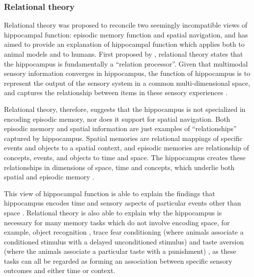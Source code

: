 \subsubsection{Relational theory}

Relational theory was proposed to reconcile two seemingly incompatible views of hippocampal function: episodic memory function and spatial navigation, and has aimed to provide an explanation of hippocampal function which applies both to animal models and to humans. First proposed by \citet{eichenbaum93}, relational theory states that the hippocampus is fundamentally a ``relation processor''. Given that multimodal sensory information converges in hippocampus, the function of hippocampus is to represent the output of the sensory system in a common multi-dimensional space, and captures the relationship between items in these sensory experiences \citep{eichenbaum93}.

Relational theory, therefore, suggests that the hippocampus is not specialized in encoding episodic memory, nor does it support for spatial navigation. Both episodic memory and spatial information are just examples of ``relationships'' captured by hippocampus. Spatial memories are relational mappings of specific events and objects to a spatial context, and episodic memories are relationship of concepts, events, and objects to time and space. The hippocampus creates these relationships in dimensions of space, time and concepts, which underlie both spatial and episodic memory \citep{eichenbaum14}.

This view of hippocampal function is able to explain the findings that hippocampus encodes time and sensory aspects of particular events other than space \citep{hampson93, young94, wood99, moser08}. Relational theory is also able to explain why the hippocampus is necessary for many memory tasks which do not involve encoding space, for example, object recognition \citep{eacott04, langston10}, trace fear conditioning (where animals associate a conditioned stimulus with a delayed unconditioned stimulus) \citep{crestani02, mcechron98} and taste aversion (where the animals associate a particular taste with a punishment) \citep{best73, gallo95}, as these tasks can all be regarded as forming an association between specific sensory outcomes and either time or context. 

